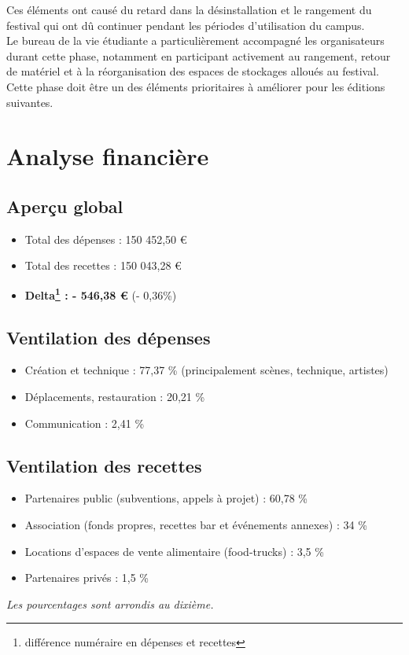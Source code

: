 \documentclass[12pt,a4paper]{report}
\begin{document}
Ces éléments ont causé du retard dans la désinstallation et le rangement du festival qui ont dû continuer pendant les périodes d’utilisation du campus.\\

Le bureau de la vie étudiante a particulièrement accompagné les organisateurs durant cette phase, notamment en participant activement au rangement, retour de matériel et à la réorganisation des espaces de stockages alloués au festival.\\

Cette phase doit être un des éléments prioritaires à améliorer pour les éditions suivantes.

\chapter{Analyse financière}

\section{Aperçu global}
\begin{itemize}
\item Total des dépenses : 150 452,50 €
\item Total des recettes : 150 043,28 €
\item \textbf{Delta\footnote{différence numéraire en dépenses et recettes} : - 546,38 €} (- 0,36\%)
\end{itemize}

\section{Ventilation des dépenses}
\begin{itemize}
\item Création et technique : 77,37 \% (principalement scènes, technique, artistes)
\item Déplacements, restauration : 20,21 \%
\item Communication : 2,41 \%
\end{itemize}

\section{Ventilation des recettes}
\begin{itemize}
\item Partenaires public (subventions, appels à projet) : 60,78 \%
\item Association (fonds propres, recettes bar et événements annexes) : 34 \%
\item Locations d'espaces de vente alimentaire (food-trucks) : 3,5 \%
\item Partenaires privés : 1,5 \%
\end{itemize}
\textit{Les pourcentages sont arrondis au dixième.}
\end{document}
